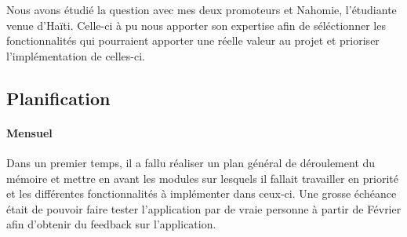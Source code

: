 \documentclass{EPL-master-thesis-covers-FR}
\begin{document}
			Nous avons étudié la question avec mes deux promoteurs et Nahomie, l'étudiante venue d'Haïti. Celle-ci à pu nous apporter son expertise afin de séléctionner les fonctionnalités qui pourraient apporter une réelle valeur au projet et prioriser l'implémentation de celles-ci.
		
			
			
		
		


			\subsection*{Planification}
				\label{sec:planification}
				
				\paragraph*{Mensuel}
				Dans un premier temps, il a fallu réaliser un plan général de déroulement du mémoire et mettre en avant les modules sur lesquels il fallait travailler en priorité et les différentes fonctionnalités à implémenter dans ceux-ci. Une grosse échéance était de pouvoir faire tester l'application par de vraie personne à partir de Février afin d'obtenir du feedback sur l'application.
				
				
\end{document}
